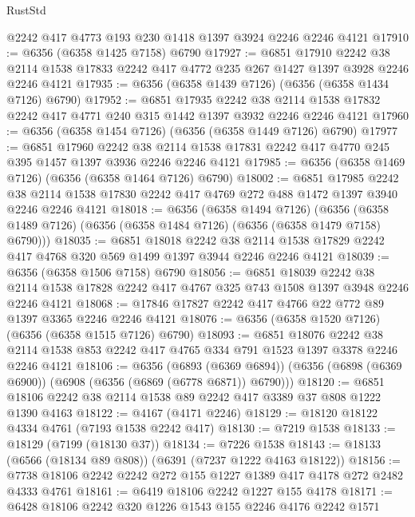 \begin{lexlean}{RustStd}
\begin{coremodule}
{\begin{coremodule}
{{{{{{{{{{{{{{{{{{{{{{{{{{    @2242
    @417
    @4773
    @193
    @230
    @1418
    @1397
    @3924
    @2246
    @2246
    @4121
@17910 := @6356 (@6358 @1425 @7158) @6790
@17927 := @6851
    @17910
    @2242
    @38
    @2114
    @1538
    @17833
    @2242
    @417
    @4772
    @235
    @267
    @1427
    @1397
    @3928
    @2246
    @2246
    @4121
@17935 := @6356 (@6358 @1439 @7126) (@6356 (@6358 @1434 @7126) @6790)
@17952 := @6851
    @17935
    @2242
    @38
    @2114
    @1538
    @17832
    @2242
    @417
    @4771
    @240
    @315
    @1442
    @1397
    @3932
    @2246
    @2246
    @4121
@17960 := @6356 (@6358 @1454 @7126) (@6356 (@6358 @1449 @7126) @6790)
@17977 := @6851
    @17960
    @2242
    @38
    @2114
    @1538
    @17831
    @2242
    @417
    @4770
    @245
    @395
    @1457
    @1397
    @3936
    @2246
    @2246
    @4121
@17985 := @6356 (@6358 @1469 @7126) (@6356 (@6358 @1464 @7126) @6790)
@18002 := @6851
    @17985
    @2242
    @38
    @2114
    @1538
    @17830
    @2242
    @417
    @4769
    @272
    @488
    @1472
    @1397
    @3940
    @2246
    @2246
    @4121
@18018 := @6356
    (@6358 @1494 @7126)
    (@6356 (@6358 @1489 @7126) (@6356 (@6358 @1484 @7126) (@6356 (@6358 @1479 @7158) @6790)))
@18035 := @6851
    @18018
    @2242
    @38
    @2114
    @1538
    @17829
    @2242
    @417
    @4768
    @320
    @569
    @1499
    @1397
    @3944
    @2246
    @2246
    @4121
@18039 := @6356 (@6358 @1506 @7158) @6790
@18056 := @6851
    @18039
    @2242
    @38
    @2114
    @1538
    @17828
    @2242
    @417
    @4767
    @325
    @743
    @1508
    @1397
    @3948
    @2246
    @2246
    @4121
@18068 := @17846 @17827 @2242 @417 @4766 @22 @772 @89 @1397 @3365 @2246 @2246 @4121
@18076 := @6356 (@6358 @1520 @7126) (@6356 (@6358 @1515 @7126) @6790)
@18093 := @6851
    @18076
    @2242
    @38
    @2114
    @1538
    @853
    @2242
    @417
    @4765
    @334
    @791
    @1523
    @1397
    @3378
    @2246
    @2246
    @4121
@18106 := @6356
    (@6893 (@6369 @6894))
    (@6356 (@6898 (@6369 @6900)) (@6908 (@6356 (@6869 (@6778 @6871)) @6790)))
@18120 := @6851 @18106 @2242 @38 @2114 @1538 @89 @2242 @417 @3389 @37 @808 @1222 @1390 @4163
@18122 := @4167 (@4171 @2246)
@18129 := @18120 @18122 @4334 @4761 (@7193 @1538 @2242 @417)
@18130 := @7219 @1538
@18133 := @18129 (@7199 (@18130 @37))
@18134 := @7226 @1538
@18143 := @18133 (@6566 (@18134 @89 @808)) (@6391 (@7237 @1222 @4163 @18122))
@18156 := @7738 @18106 @2242 @2242 @272 @155 @1227 @1389 @417 @4178 @272 @2482 @4333 @4761
@18161 := @6419 @18106 @2242 @1227 @155 @4178
@18171 := @6428 @18106 @2242 @320 @1226 @1543 @155 @2246 @4176 @2242 @1571
}}}}}}}}}}}}}}}}}}}}}}}}}}
\end{coremodule}}
\end{coremodule}
\end{lexlean}
